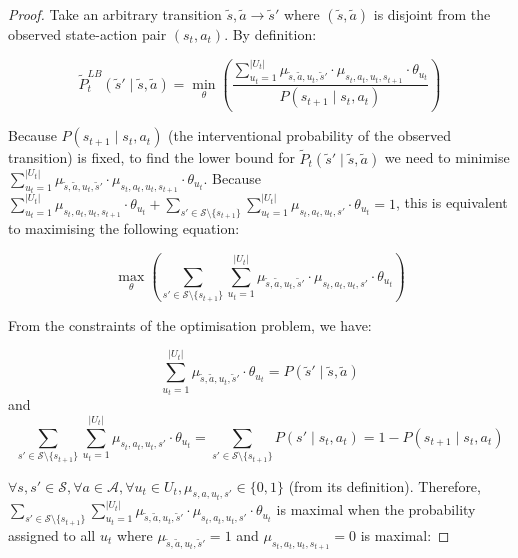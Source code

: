 \begin{proof}
Take an arbitrary transition $\tilde{s}, \tilde{a} \rightarrow \tilde{s}'$ where $(\tilde{s}, \tilde{a})$ is disjoint from the observed state-action pair $(s_t, a_t)$. By definition:

\[\tilde{P}_{t}^{LB}(\tilde{s}' \mid \tilde{s}, \tilde{a}) = \min_\theta \left(\frac{\sum_{u_t = 1}^{|U_t|} \mu_{\tilde{s}, \tilde{a}, u_t, \tilde{s}'} \cdot \mu_{s_t, a_t, u_t, s_{t+1}} \cdot \theta_{u_t}}{P(s_{t+1} \mid s_t, a_t)}\right)\]

Because $P(s_{t+1} \mid s_t, a_t)$ (the interventional probability of the observed transition) is fixed, to find the lower bound for $\tilde{P}_t(\tilde{s}' \mid \tilde{s}, \tilde{a})$ we need to minimise $\sum_{u_t = 1}^{|U_t|} \mu_{\tilde{s}, \tilde{a}, u_t, \tilde{s}'} \cdot \mu_{s_t, a_t, u_t, s_{t+1}} \cdot \theta_{u_t}$. Because $\sum_{u_t = 1}^{|U_t|} \mu_{s_t, a_t, u_t, s_{t+1}} \cdot \theta_{u_t} + \sum_{s' \in \mathcal{S}\setminus{\{s_{t+1}\}}}\sum_{u_t = 1}^{|U_t|} \mu_{s_t, a_t, u_t, s'} \cdot \theta_{u_t} = 1$, this is equivalent to maximising the following equation:

\[
\max_\theta \left( \sum_{s' \in \mathcal{S}\setminus{\{s_{t+1}\}}}\sum_{u_t = 1}^{|U_t|} \mu_{\tilde{s}, \tilde{a}, u_t, \tilde{s}'} \cdot \mu_{s_t, a_t, u_t, s'} \cdot \theta_{u_t}\right)
\]

From the constraints of the optimisation problem, we have:

\begin{equation}
    \label{eq: theorem 4.8 constraint 1}
    \sum_{u_t = 1}^{|U_t|} \mu_{\tilde{s}, \tilde{a}, u_t, \tilde{s}'}\cdot \theta_{u_t} = P(\tilde{s}' \mid \tilde{s}, \tilde{a})
\end{equation}
and
\begin{equation}
\label{eq: theorem 4.8 constraint 2}
    \sum_{s' \in \mathcal{S}\setminus{\{s_{t+1}\}}}\sum_{u_t = 1}^{|U_t|} \mu_{s_t, a_t, u_t, s'} \cdot \theta_{u_t} = \sum_{s' \in \mathcal{S}\setminus{\{s_{t+1}\}}}{P(s' \mid s_t, a_t)} = 1 - P(s_{t+1} \mid s_t, a_t)
\end{equation}

$\forall s,s' \in \mathcal{S}, \forall a \in \mathcal{A}, \forall u_t \in U_t, \mu_{s, a, u_t, s'} \in \{0, 1\}$ (from its definition). Therefore,\\ $\sum_{s' \in \mathcal{S}\setminus{\{s_{t+1}\}}}\sum_{u_t = 1}^{|U_t|} \mu_{\tilde{s}, \tilde{a}, u_t, \tilde{s}'} \cdot \mu_{s_t, a_t, u_t, s'} \cdot \theta_{u_t}$ is maximal when the probability assigned to all $u_t$ where $\mu_{\tilde{s}, \tilde{a}, u_t, \tilde{s}'} = 1$ and $\mu_{s_t, a_t, u_t, s_{t+1}}=0$ is maximal:


\end{proof}
